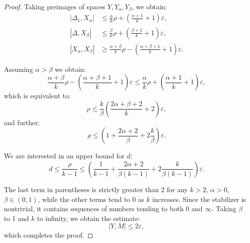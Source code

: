 \documentclass[10pt,a4paper]{amsart}
\begin{document}
\begin{proof}
Taking preimages of spaces $Y, Y_{\alpha}, Y_{\beta}$, we obtain:
\begin{align*}
|\Delta_1, X_{\alpha}| &\leq \frac{\alpha}{k}\rho + \left(\frac{\alpha+1}{k} + 1\right)\varepsilon, \\
|\Delta, X_{\beta}| &\leq \frac{\beta}{k}\rho + \left(\frac{\beta+1}{k}+1\right)\varepsilon, \\
|X_\alpha, X_{\beta}| &\geq \frac{\alpha+\beta}{k}\rho - \left(\frac{\alpha+\beta+1}{k}+1\right)\varepsilon.
\end{align*}

Assuming $\alpha > \beta$ we obtain:
$$
\frac{\alpha+\beta}{k}\rho - \left(\frac{\alpha+\beta+1}{k}+1\right)\varepsilon \leq \frac{\alpha}{k}\rho + \left(\frac{\alpha+1}{k} + 1\right)\varepsilon,
$$
which is equivalent to:
$$
\rho \leq \frac{k}{\beta}\left(\frac{2\alpha+\beta+2}{k}+2\right)\varepsilon,
$$
and further:
$$
\rho \leq \left(1+\frac{2\alpha + 2}{\beta} + 2\frac{k}{\beta}\right)\varepsilon.
$$

We are interested in an upper bound for $d$:
$$
d \leq \frac{\rho}{k-1} \leq \left(\frac{1}{k-1}+\frac{2\alpha + 2}{\beta(k-1)} + 2\frac{k}{\beta(k-1)}\right)\varepsilon.
$$

The last term in parentheses is strictly greater than 2 for any $k>2$, $\alpha>0$, $\beta\in (0,1)$, while the other terms tend to 0 as $k$ increases. Since the stabilizer is nontrivial, it contains sequences of numbers tending to both 0 and $\infty$. Taking $\beta$ to 1 and $k$ to infinity, we obtain the estimate:
$$
|Y, M| \leq 2\varepsilon,
$$
which completes the proof.
\end{proof}
\end{document}
